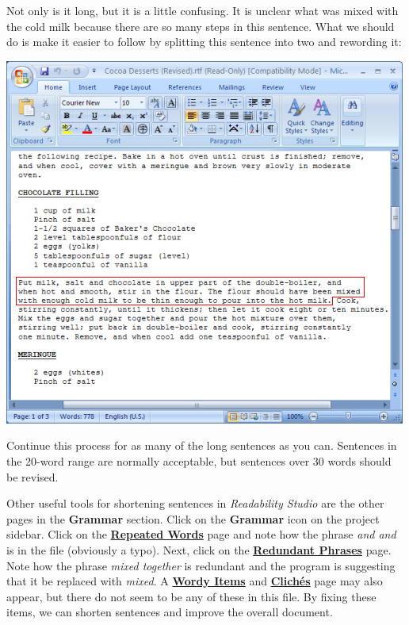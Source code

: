 \documentclass[
]{book}
\theoremstyle{definition}
\theoremstyle{definition}
\theoremstyle{definition}
\theoremstyle{definition}
\theoremstyle{remark}
\begin{document}
Not only is it long, but it is a little confusing. It is unclear what was mixed with the cold milk because there are so many steps in this sentence. What we should do is make it easier to follow by splitting this sentence into two and rewording it:

\includegraphics{Images/NonGenerated/improvedsentence.png}

Continue this process for as many of the long sentences as you can. Sentences in the 20-word range are normally acceptable, but sentences over 30 words should be revised.

Other useful tools for shortening sentences in \emph{Readability Studio} are the other pages in the \textbf{Grammar} section. Click on the \textbf{Grammar} icon on the project sidebar. Click on the \protect\hyperlink{reviewing-repeated-words}{\textbf{Repeated Words}} page and note how the phrase \emph{and and} is in the file (obviously a typo). Next, click on the \protect\hyperlink{reviewing-redundant-phrases}{\textbf{Redundant Phrases}} page. Note how the phrase \emph{mixed together} is redundant and the program is suggesting that it be replaced with \emph{mixed}. A \protect\hyperlink{reviewing-wordy-items}{\textbf{Wordy Items}} and \protect\hyperlink{reviewing-cliches}{\textbf{Clichés}} page may also appear, but there do not seem to be any of these in this file. By fixing these items, we can shorten sentences and improve the overall document.
\end{document}
